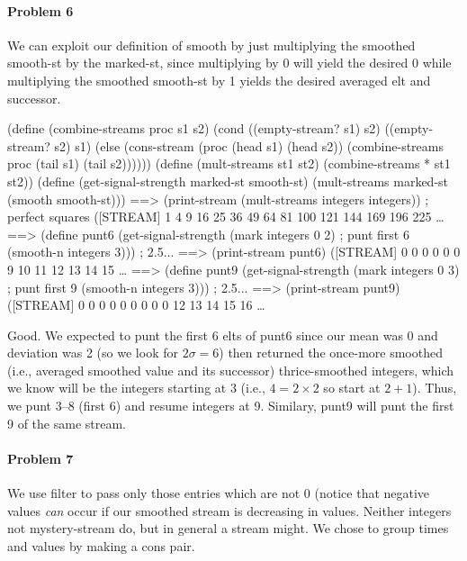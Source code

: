 \paragraph{Problem 6}

We can exploit our definition of {\cf smooth} by just multiplying the smoothed
{\cf smooth-st} by the {\cf marked-st}, since multiplying by 0 will yield the
desired 0 while multiplying the smoothed {\cf smooth-st} by 1 yields the
desired averaged elt and successor.

\beginlisp
(define (combine-streams proc s1 s2)
  (cond ((empty-stream? s1) s2)
        ((empty-stream? s2) s1)
        (else
         (cons-stream (proc (head s1) (head s2))
                      (combine-streams proc (tail s1) (tail s2))))))
\null
(define (mult-streams st1 st2)
  (combine-streams  * st1 st2))
\null
(define (get-signal-strength marked-st smooth-st)
  (mult-streams marked-st (smooth smooth-st)))
\null
==> (print-stream (mult-streams integers integers))   ; perfect squares
([STREAM] 1 4 9 16 25 36 49 64 81 100 121 144 169 196 225 \ldots
\null
==> (define punt6 (get-signal-strength (mark integers 0 2)     ; punt first 6
                                       (smooth-n integers 3))) ; 2.5...
==> (print-stream punt6)
([STREAM] 0 0 0 0 0 0 9 10 11 12 13 14 15 \ldots
==> (define punt9 (get-signal-strength (mark integers 0 3)     ; punt first 9
                                       (smooth-n integers 3))) ; 2.5...
==> (print-stream punt9)
([STREAM] 0 0 0 0 0 0 0 0 0 12 13 14 15 16 \ldots
\endlisp

Good.  We expected to punt the first 6 elts of {\cf punt6} since our mean was 0
and deviation was 2 (so we look for $2\sigma = 6$) then returned the once-more
smoothed (i.e., averaged smoothed value and its successor)
thrice-smoothed integers, which we know will be the integers starting
at 3 (i.e., $4 = 2 \times 2$ so start at $2+1$).  Thus, we punt 3--8 (first 6)
and resume integers at 9. Similary, {\cf punt9} will punt the first 9 of the
same stream.

\paragraph{Problem 7}

We use {\cf filter} to pass only those entries which are not 0 (notice that
negative values {\it can\/} occur if our smoothed stream is decreasing in
values. Neither {\cf integers} not {\cf mystery-stream} do, but in general a
stream might.  We chose to group times and values by making a {\cf cons} pair.

